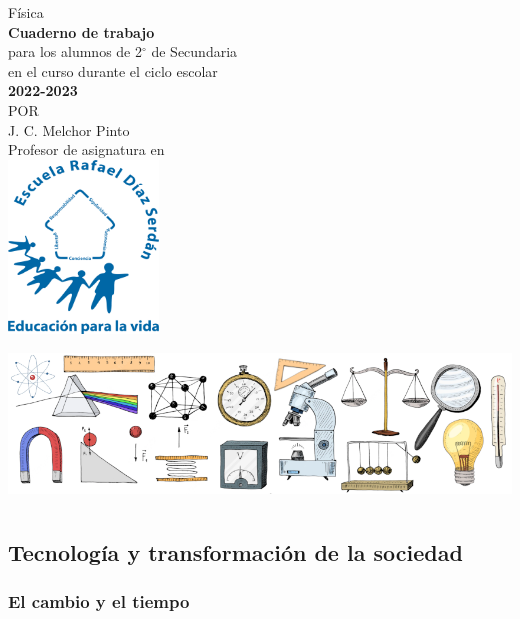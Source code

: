 \documentclass[11pt]{book}
\begin{document}
\pagestyle{empty}
\begin{center}
  {\Huge F\'isica}\\
  \vspace{2cm}
  \normalsize
  \textbf{\large Cuaderno de trabajo}\\
  para los alumnos de 2$^\circ$ de  Secundaria\\
  en el curso durante el ciclo escolar\\
  \textbf{2022-2023}\\
  \vspace{2.5cm}
  \small POR\\
  \Large J. C. Melchor Pinto\\[0.5em]
  \normalsize Profesor de asignatura en\\
  \vspace{1cm}
  \includegraphics[width=4cm]{./Unidad 2/Images/LOGO_RDS_nobg}
\end{center}
\vspace{2cm}
%
\hspace{-16mm}
\includegraphics[width=\paperwidth]{./Unidad 2/Images/cover_bg}
\restoregeometry
\tableofcontents
\chapter{}

\section{Tecnología y transformación de la sociedad}
\subsection{El cambio y el tiempo}
\end{document}
